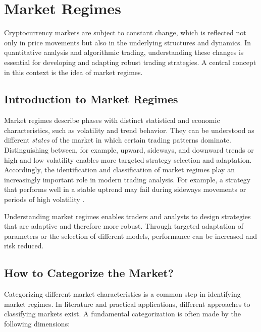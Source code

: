 \section{Market Regimes}
\label{chap:market-regimes}

Cryptocurrency markets are subject to constant change, which is reflected not only in price movements but also in the underlying structures and dynamics.
In quantitative analysis and algorithmic trading, understanding these changes is essential for developing and adapting robust trading strategies.
A central concept in this context is the idea of market regimes.

\subsection{Introduction to Market Regimes}


Market regimes describe phases with distinct statistical and economic characteristics, such as volatility and trend behavior.
They can be understood as different \textit{states} of the market in which certain trading patterns dominate.
Distinguishing between, for example, upward, sideways, and downward trends or high and low volatility enables more targeted strategy selection and adaptation.
Accordingly, the identification and classification of market regimes play an increasingly important role in modern trading analysis.
For example, a strategy that performs well in a stable uptrend may fail during sideways movements or periods of high volatility \cite{macrosynergy-market-regime-introduction}.


Understanding market regimes enables traders and analysts to design strategies that are adaptive and therefore more robust.
Through targeted adaptation of parameters or the selection of different models, performance can be increased and risk reduced.



\subsection{How to Categorize the Market?}
\label{chap:market-regime-categories}

Categorizing different market characteristics is a common step in identifying market regimes.
In literature and practical applications, different approaches to classifying markets exist.
A fundamental categorization is often made by the following dimensions:

